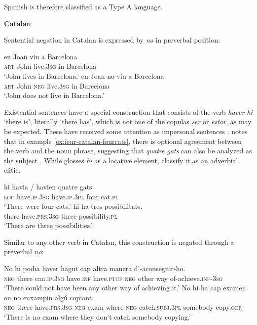 \documentclass[output=paper]{langsci/langscibook}
\begin{document}
\begin{unindented}
Spanish is therefore classified as a Type A language. 

\textbf{Catalan}

Sentential negation in Catalan is expressed by \textit{no} in preverbal position: 
%
\begin{exe}\ex \gll en Joan viu a Barcelona \\
\textsc{art} John  live.\textsc{3sg} in Barcelona \\
    \glt `John lives in Barcelona.' \citep[154]{Hualde1992}
\ex \gll en Joan  no viu a Barcelona \\
\textsc{art} John  \textsc{neg} live.\textsc{3sg} in Barcelona \\
    \glt `John does not live in Barcelona.' \citep[154]{Hualde1992}
    \end{exe}

Existential sentences have a special construction that consists of the verb
\textit{haver-hi} `there is', literally `there has', which is not one of
the copulas \textit{ser} or \textit{estar}, as may be expected. These have
received some attention as impersonal sentences \parencites[81]{Hualde1992}
[460]{WheelerYates1999}. \citet[81]{Hualde1992} notes that in example
\ref{ex:ieur-catalan-fourcats},
there is optional agreement between the verb and the noun phrase,
suggesting that \textit{quatre gats} can also be analyzed as the subject
\parencite[see also][460]{WheelerYates1999}. While \citet{Hualde1992} glosses \textit{hi} as a locative element, \citet[460]{WheelerYates1999} classify it as an adverbial clitic. 
%
\begin{exe}\ex\label{ex:ieur-catalan-fourcats} \gll hi havia / havien quatre gats \\
\textsc{loc} have.\textsc{ip.3sg} {} have.\textsc{ip.3pl} four cat.\textsc{pl} \\
    \glt `There were four cats.' \citep[81]{Hualde1992}
\ex \gll hi ha tres possibilitats.  \\
there have.\textsc{prs.3sg} three  possibility.\textsc{pl} \\
    \glt `There are three possibilities.' \parencite[460]{WheelerYates1999}
    \end{exe}

Similar to any other verb in Catalan, this construction is negated through a preverbal \textit{no}: 
%
\begin{exe}\ex \gll No hi podia haver hagut cap  altra manera d’-aconseguir-ho. \\
\textsc{neg} there can.\textsc{ip.3sg} have.\textsc{inf} have.\textsc{ptcp} \textsc{neg} other way of-achieve.\textsc{inf-3sg} \\
    \glt `There could not have been any other way of achieving it.'
\parencite[460]{WheelerYates1999}
\ex \gll No hi ha cap examen on no enxampin algú copiant.  \\
\textsc{neg} there have.\textsc{prs.3sg} \textsc{neg} exam     where \textsc{neg} catch.\textsc{subj.3pl} somebody copy.\textsc{ger} \\
    \glt `There is no exam where they don't catch somebody copying.' \parencite[422]{WheelerYates1999}
    \end{exe}


\end{unindented}
\end{document}

